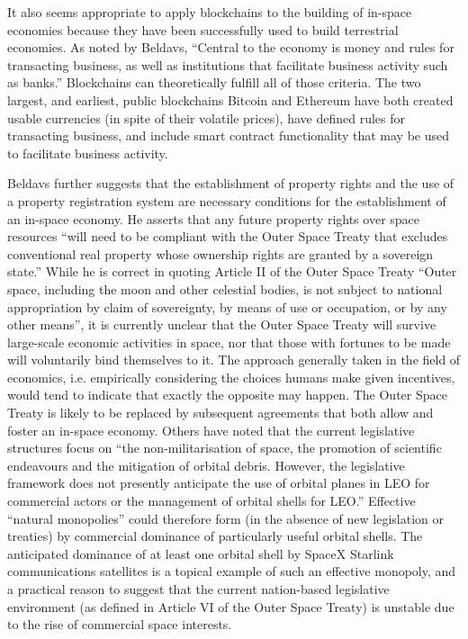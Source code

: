 \documentclass[]{aiaa-tc}%
\begin{document}
It also seems appropriate to apply blockchains to the building of in-space economies because they have been successfully used to build terrestrial economies. As noted by Beldavs\cite{beldavs_blockchains_2016}, ``Central to the economy is money and rules for transacting business, as well as institutions that facilitate business activity such as banks.'' Blockchains can theoretically fulfill all of those criteria. The two largest, and earliest, public blockchains Bitcoin\cite{nakamoto_bitcoin_2008} and Ethereum\cite{buterin_ethereum_2013,wood_ethereum_2014} have both created usable currencies (in spite of their volatile prices), have defined rules for transacting business, and include smart contract functionality\cite{szabo_smart_1994} that may be used to facilitate business activity.

Beldavs\cite{beldavs_blockchains_2016} further suggests that the establishment of property rights and the use of a property registration system are necessary conditions for the establishment of an in-space economy\cite{beldavs_blockchains_2016}. He asserts that any future property rights over space resources ``will need to be compliant with the Outer Space Treaty that excludes conventional real property whose ownership rights are granted by a sovereign state.'' While he is correct in quoting Article II of the Outer Space Treaty\cite{UNCPUOS_1967} ``Outer space, including the moon and other celestial bodies, is not subject to national appropriation by claim of sovereignty, by means of use or occupation, or by any other means'', it is currently unclear that the Outer Space Treaty will survive large-scale economic activities in space, nor that those with fortunes to be made will voluntarily bind themselves to it. The approach generally taken in the field of economics, i.e. empirically considering the choices humans make given incentives, would tend to indicate that exactly the opposite may happen. The Outer Space Treaty is likely to be replaced by subsequent agreements that both allow and foster an in-space economy. Others have noted that the current legislative structures focus on ``the non-militarisation of space, the promotion of scientific endeavours and the mitigation of orbital debris. However, the legislative framework does not presently anticipate the use of orbital planes in LEO for commercial actors or the management of orbital shells for LEO.''\cite{green_mitigation_2018} Effective ``natural monopolies'' could therefore form (in the absence of new legislation or treaties) by commercial dominance of particularly useful orbital shells. The anticipated dominance of at least one orbital shell by SpaceX Starlink communications satellites is a topical example of such an effective monopoly, and a practical reason to suggest that the current nation-based legislative environment (as defined in Article VI of the Outer Space Treaty\cite{UNCPUOS_1967}) is unstable due to the rise of commercial space interests.
\end{document}
